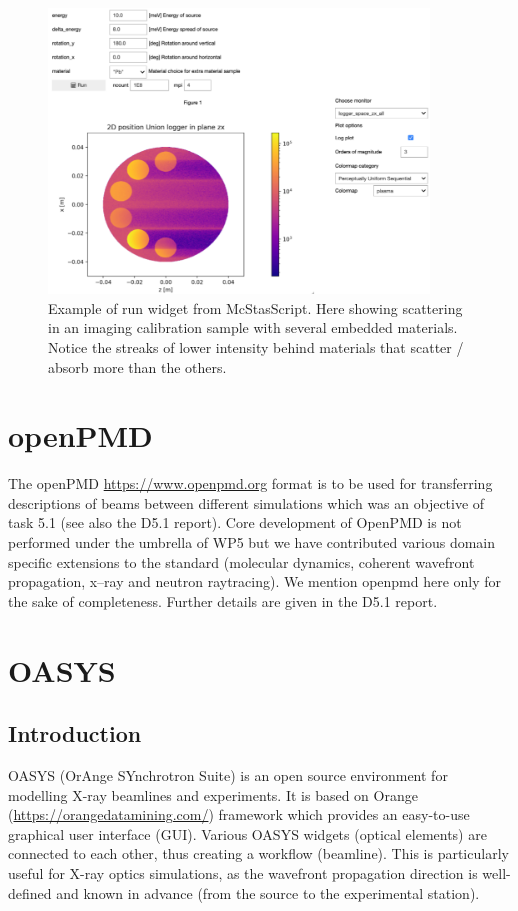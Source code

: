 \documentclass[11pt, a4paper]{article}
\begin{document}
\begin{figure}
\centering
\includegraphics[width=0.9\textwidth]{figures/widget.png}
\caption{\label{fig:widget}Example of run widget from McStasScript. Here showing scattering in an imaging calibration sample with several embedded materials. Notice the streaks of lower intensity behind materials that scatter / absorb more than the others.}
\end{figure}

\clearpage
\section{openPMD\label{sec:openpmd}}
The openPMD \href{https://www.openpmd.org}{https://www.openpmd.org} format is to
be used for transferring descriptions of beams between different simulations
which was an objective of task 5.1 (see also the D5.1 report).
Core development of OpenPMD is not performed under the umbrella of WP5 but we
have contributed various domain specific extensions to the standard (molecular
dynamics, coherent wavefront propagation, x--ray and neutron raytracing). We mention
openpmd here only for the sake of completeness. Further details are given in the
D5.1 report.
\section{OASYS}

\subsection{Introduction}

OASYS (OrAnge SYnchrotron Suite) is an open source environment for modelling X-ray beamlines and experiments. It is based on Orange (\url{https://orangedatamining.com/}) framework which provides an easy-to-use graphical user interface (GUI). Various OASYS widgets (optical elements) are connected to each other, thus creating a workflow (beamline). This is particularly useful for X-ray optics simulations, as the wavefront propagation direction is well-defined and known in advance (from the source to the experimental station).
\end{document}
